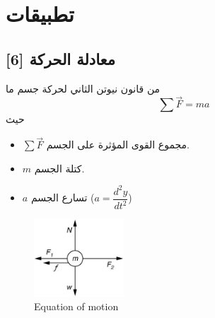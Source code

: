 \chapter{تطبيقات}

\section[معادلة الحركة \en{Equation of Motion} ]{معادلة الحركة  [6]}

من قانون نيوتن الثاني لحركة جسم ما 
\begin{equation}
	\label{eq:newton2law}
	\sum \vec{F} = m a
\end{equation}
حيث 
\begin{itemize}
	\item $\sum \vec{F}$ مجموع القوى المؤثرة على الجسم.
	\item $m$ كتلة الجسم.
	\item $a$ تسارع الجسم ($a = \dfrac{d^2 y}{dt^2}$)
\end{itemize}

\begin{english}
	\begin{figure}[ht]
	\centering
	\includegraphics[width=0.3\textwidth]{Figures/em.jpg}
	\caption{Equation of motion}
\end{figure}
\end{english}

